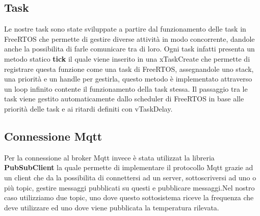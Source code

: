 \documentclass{report}
\begin{document}
\subsection{Task}
\par{
    Le nostre task sono state sviluppate a partire dal funzionamento delle task in FreeRTOS che permette di gestire diverse attività in modo concorrente, dandole anche la possibilita di farle comunicare tra di loro. Ogni task infatti presenta un metodo statico \textbf{tick} il quale viene inserito in una xTaskCreate che permette di registrare questa funzione come una task di FreeRTOS, assegnandole uno stack, una priorità e un handle per gestirla, questo metodo è implementato attraverso un loop infinito contente il funzionamento della task stessa. Il passaggio tra le task viene gestito automaticamente dallo scheduler di FreeRTOS in base alle priorità delle task e ai ritardi definiti con vTaskDelay.
}
\subsection{Connessione Mqtt}
\par{
    Per la connessione al broker Mqtt invece è stata utilizzat la libreria \textbf{PubSubClient} la quale permette di implementare il protocollo Mqtt grazie ad un client che da la possibilita di connettersi ad un server, sottoscriversi ad uno o più topic, gestire messaggi pubblicati su questi e pubblicare messaggi.Nel nostro caso utilizziamo due topic, uno dove questo sottosistema riceve la frequenza che deve utilizzare ed uno dove viene pubblicata la temperatura rilevata.
}
\end{document}

